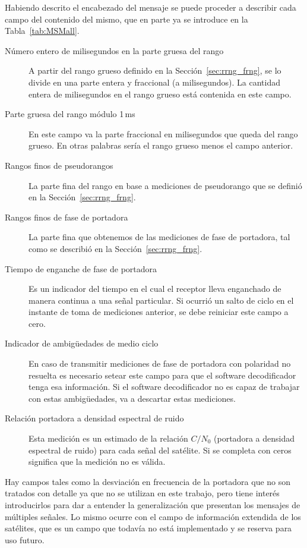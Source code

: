 \documentclass[a4paper,12pt,oneside,onecolumn,final,openright]{book}%
\begin{document}
	Habiendo descrito el encabezado del mensaje se puede proceder a describir cada campo del contenido del mismo, que en parte ya se introduce en la Tabla~\ref{tab:MSMall}. 
\begin{description}
	\item[Número entero de milisegundos en la parte gruesa del rango] A partir del rango grueso definido en la Sección~\ref{sec:rrng_frng}, se lo divide en una parte entera y fraccional (a milisegundos). La cantidad entera de milisegundos en el rango grueso está contenida en este campo.
	\item[Parte gruesa del rango módulo 1\,ms] En este campo va la parte fraccional en milisegundos que queda del rango grueso. En otras palabras sería el rango grueso menos el campo anterior.
	\item[Rangos finos de pseudorangos] La parte fina del rango en base a mediciones de pseudorango que se definió en la Sección~\ref{sec:rrng_frng}.
	\item[Rangos finos de fase de portadora] La parte fina que obtenemos de las mediciones de fase de portadora, tal como se describió en la Sección~\ref{sec:rrng_frng}.
	\item[Tiempo de enganche de fase de portadora] Es un indicador del tiempo en el cual el receptor lleva enganchado de manera continua a una señal particular. Si ocurrió un salto de ciclo en el instante de toma de mediciones anterior, se debe reiniciar este campo a cero.
	\item[Indicador de ambigüedades de medio ciclo] En caso de transmitir mediciones de fase de portadora con polaridad no resuelta es necesario setear este campo para que el software decodificador tenga esa información. Si el software decodificador no es capaz de trabajar con estas ambigüedades, va a descartar estas mediciones.
	\item[Relación portadora a densidad espectral de ruido] Esta medición es un estimado de la relación $C/N_0$ (portadora a densidad espectral de ruido) para cada señal del satélite. Si se completa con ceros significa que la medición no es válida.
\end{description}

	Hay campos tales como la desviación en frecuencia de la portadora que no son tratados con detalle ya que no se utilizan en este trabajo, pero tiene interés introducirlos para dar a entender la generalización que presentan los mensajes de múltiples señales. Lo mismo ocurre con el campo de información extendida de los satélites, que es un campo que todavía no está implementado y se reserva para uso futuro.\\
\end{document}
